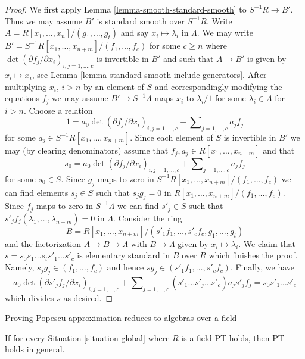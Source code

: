 \begin{proof}
We first apply Lemma \ref{lemma-smooth-standard-smooth} to $S^{-1}R \to B'$.
Thus we may assume $B'$ is standard smooth over $S^{-1}R$.
Write $A = R[x_1, \ldots, x_n]/(g_1, \ldots, g_t)$ and say
$x_i \mapsto \lambda_i$ in $\Lambda$. We may write
$B' = S^{-1}R[x_1, \ldots, x_{n + m}]/(f_1, \ldots, f_c)$
for some $c \geq n$ where
$\det(\partial f_j/\partial x_i)_{i, j = 1, \ldots, c}$
is invertible in $B'$ and such that $A \to B'$ is given by $x_i \mapsto x_i$,
see Lemma \ref{lemma-standard-smooth-include-generators}.
After multiplying $x_i$, $i > n$ by an element of $S$ and correspondingly
modifying the equations $f_j$ we may assume $B' \to S^{-1}\Lambda$ maps
$x_i$ to $\lambda_i/1$ for some $\lambda_i \in \Lambda$ for $i > n$.
Choose a relation
$$
1 =
a_0 \det(\partial f_j/\partial x_i)_{i, j = 1, \ldots, c}
+
\sum\nolimits_{j = 1, \ldots, c} a_jf_j
$$
for some $a_j \in S^{-1}R[x_1, \ldots, x_{n + m}]$. Since each element of $S$
is invertible in $B'$ we may (by clearing denominators) assume that
$f_j, a_j \in R[x_1, \ldots, x_{n + m}]$ and that
$$
s_0 = a_0 \det(\partial f_j/\partial x_i)_{i, j = 1, \ldots, c}
+
\sum\nolimits_{j = 1, \ldots, c} a_jf_j
$$
for some $s_0 \in S$. Since $g_j$ maps to zero in
$S^{-1}R[x_1, \ldots, x_{n + m}]/(f_1, \ldots, f_c)$
we can find elements $s_j \in S$ such that $s_j g_j = 0$ in
$R[x_1, \ldots, x_{n + m}]/(f_1, \ldots, f_c)$.
Since $f_j$ maps to zero in $S^{-1}\Lambda$ we can find $s'_j \in S$
such that $s'_j f_j(\lambda_1, \ldots, \lambda_{n + m}) = 0$ in
$\Lambda$. Consider the ring
$$
B = R[x_1, \ldots, x_{n + m}]/
(s'_1f_1, \ldots, s'_cf_c, g_1, \ldots, g_t)
$$
and the factorization $A \to B \to \Lambda$ with $B \to \Lambda$ given by
$x_i \mapsto \lambda_i$. We claim that $s = s_0s_1 \ldots s_ts'_1 \ldots s'_c$
is elementary standard in $B$ over $R$ which finishes the proof.
Namely, $s_j g_j \in (f_1, \ldots, f_c)$ and hence
$sg_j \in (s'_1f_1, \ldots, s'_cf_c)$. Finally, we have
$$
a_0\det(\partial s'_jf_j/\partial x_i)_{i, j = 1, \ldots, c}
+
\sum\nolimits_{j = 1, \ldots, c}
(s'_1 \ldots \hat{s'_j} \ldots s'_c) a_j s'_jf_j
=
s_0s'_1\ldots s'_c
$$
which divides $s$ as desired.
\end{proof}

\begin{lemma}
\label{lemma-reduce-to-field}
\begin{slogan}
Proving Popescu approximation reduces to algebras over a field
\end{slogan}
If for every Situation \ref{situation-global} where $R$
is a field PT holds, then PT holds in general.
\end{lemma}

